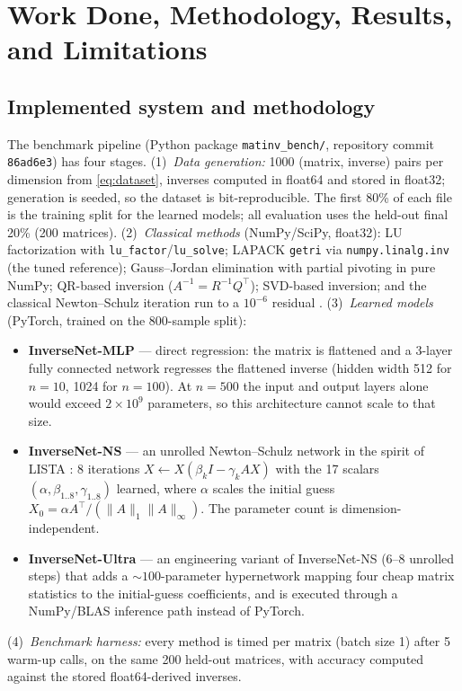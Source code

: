 \documentclass[11pt,a4paper]{article}
\begin{document}
\section{Work Done, Methodology, Results, and Limitations}
\label{sec:work}

\subsection{Implemented system and methodology}

The benchmark pipeline (Python package \texttt{matinv\_bench/}, repository
commit \texttt{86ad6e3}) has four stages. (1)~\emph{Data generation:} 1000
(matrix, inverse) pairs per dimension from \eqref{eq:dataset}, inverses
computed in float64 and stored in float32; generation is seeded, so the
dataset is bit-reproducible. The first 80\% of each file is the training
split for the learned models; all evaluation uses the held-out final 20\%
(200 matrices). (2)~\emph{Classical methods} (NumPy/SciPy, float32): LU
factorization with \texttt{lu\_factor}/\texttt{lu\_solve}; LAPACK
\texttt{getri} via \texttt{numpy.linalg.inv} (the tuned reference);
Gauss--Jordan elimination with partial pivoting in pure NumPy; QR-based
inversion ($A^{-1}=R^{-1}Q^{\top}$); SVD-based inversion; and the classical
Newton--Schulz iteration run to a $10^{-6}$ residual \cite{schulz1933}.
(3)~\emph{Learned models} (PyTorch, trained on the 800-sample split):
\begin{itemize}
\item \textbf{InverseNet-MLP} --- direct regression: the matrix is flattened
and a 3-layer fully connected network regresses the flattened inverse
(hidden width 512 for $n{=}10$, 1024 for $n{=}100$). At $n{=}500$ the input
and output layers alone would exceed $2\times10^{9}$ parameters, so this
architecture cannot scale to that size.
\item \textbf{InverseNet-NS} --- an unrolled Newton--Schulz network in the
spirit of LISTA \cite{gregor2010lista}: 8 iterations
$X \leftarrow X(\beta_k I - \gamma_k A X)$ with the 17 scalars
$(\alpha, \beta_{1..8}, \gamma_{1..8})$ learned, where $\alpha$ scales the
initial guess $X_0 = \alpha A^{\top}/(\lVert A\rVert_1 \lVert A\rVert_\infty)$.
The parameter count is dimension-independent.
\item \textbf{InverseNet-Ultra} --- an engineering variant of InverseNet-NS
(6--8 unrolled steps) that adds a ${\sim}100$-parameter hypernetwork mapping
four cheap matrix statistics to the initial-guess coefficients, and is
executed through a NumPy/BLAS inference path instead of PyTorch.
\end{itemize}
(4)~\emph{Benchmark harness:} every method is timed per matrix (batch size 1)
after 5 warm-up calls, on the same 200 held-out matrices, with accuracy
computed against the stored float64-derived inverses.
\end{document}
